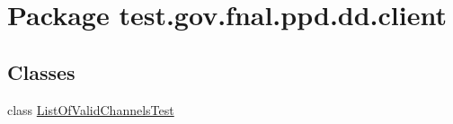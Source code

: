 \hypertarget{namespacetest_1_1gov_1_1fnal_1_1ppd_1_1dd_1_1client}{\section{Package test.\-gov.\-fnal.\-ppd.\-dd.\-client}
\label{namespacetest_1_1gov_1_1fnal_1_1ppd_1_1dd_1_1client}
}
\subsection*{Classes}
\begin{DoxyCompactItemize}
\item 
class \hyperlink{classtest_1_1gov_1_1fnal_1_1ppd_1_1dd_1_1client_1_1ListOfValidChannelsTest}{List\-Of\-Valid\-Channels\-Test}
\end{DoxyCompactItemize}
